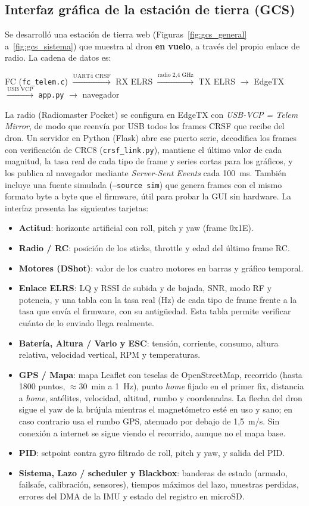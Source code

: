 \documentclass[12pt, letterpaper]{report}
\begin{document}
\subsection{Interfaz gráfica de la estación de tierra (GCS)}
Se desarrolló una estación de tierra web (Figuras~\ref{fig:gcs_general} a~\ref{fig:gcs_sistema}) que muestra al dron \textbf{en vuelo}, a través del propio enlace de radio. La cadena de datos es:
\begin{center}
\small
FC (\texttt{fc\_telem.c}) $\xrightarrow{\text{UART4 CRSF}}$ RX ELRS $\xrightarrow{\text{radio 2,4 GHz}}$ TX ELRS $\rightarrow$ EdgeTX $\xrightarrow{\text{USB VCP}}$ \texttt{app.py} $\rightarrow$ navegador
\end{center}
La radio (Radiomaster Pocket) se configura en EdgeTX con \textit{USB-VCP = Telem Mirror}, de modo que reenvía por USB todos los frames CRSF que recibe del dron. Un servidor en Python (Flask) abre ese puerto serie, decodifica los frames con verificación de CRC8 (\texttt{crsf\_link.py}), mantiene el último valor de cada magnitud, la tasa real de cada tipo de frame y series cortas para los gráficos, y los publica al navegador mediante \textit{Server-Sent Events} cada 100~ms. También incluye una fuente simulada (\texttt{--source sim}) que genera frames con el mismo formato byte a byte que el firmware, útil para probar la GUI sin hardware. La interfaz presenta las siguientes tarjetas:
\begin{itemize}
    \item \textbf{Actitud}: horizonte artificial con roll, pitch y yaw (frame 0x1E).
    \item \textbf{Radio / RC}: posición de los sticks, throttle y edad del último frame RC.
    \item \textbf{Motores (DShot)}: valor de los cuatro motores en barras y gráfico temporal.
    \item \textbf{Enlace ELRS}: LQ y RSSI de subida y de bajada, SNR, modo RF y potencia, y una tabla con la tasa real (Hz) de cada tipo de frame frente a la tasa que envía el firmware, con su antigüedad. Esta tabla permite verificar cuánto de lo enviado llega realmente.
    \item \textbf{Batería, Altura / Vario y ESC}: tensión, corriente, consumo, altura relativa, velocidad vertical, RPM y temperaturas.
    \item \textbf{GPS / Mapa}: mapa Leaflet con teselas de OpenStreetMap, recorrido (hasta 1800 puntos, $\approx 30$~min a 1~Hz), punto \textit{home} fijado en el primer fix, distancia a \textit{home}, satélites, velocidad, altitud, rumbo y coordenadas. La flecha del dron sigue el yaw de la brújula mientras el magnetómetro esté en uso y sano; en caso contrario usa el rumbo GPS, atenuado por debajo de 1,5~m/s. Sin conexión a internet se sigue viendo el recorrido, aunque no el mapa base.
    \item \textbf{PID}: setpoint contra gyro filtrado de roll, pitch y yaw, y salida del PID.
    \item \textbf{Sistema, Lazo / scheduler y Blackbox}: banderas de estado (armado, failsafe, calibración, sensores), tiempos máximos del lazo, muestras perdidas, errores del DMA de la IMU y estado del registro en microSD.
\end{itemize}
\end{document}
